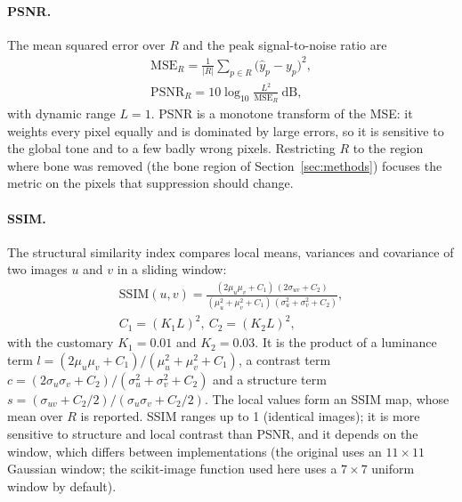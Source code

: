 \paragraph{PSNR.} The mean squared error over $R$ and the peak signal-to-noise ratio are
\begin{equation}
\begin{gathered}
\mathrm{MSE}_R=\frac{1}{|R|}\sum_{p\in R}\big(\hat y_p-y_p\big)^2,\\
\mathrm{PSNR}_R=10\log_{10}\frac{L^2}{\mathrm{MSE}_R}\ \mathrm{dB},
\end{gathered}
\label{eq:bg_psnr}
\end{equation}
with dynamic range $L=1$. PSNR is a monotone transform of the MSE: it weights every pixel equally and is dominated by large errors, so it is
sensitive to the global tone and to a few badly wrong pixels. Restricting $R$ to the region where bone was removed (the bone region of
Section~\ref{sec:methods}) focuses the metric on the pixels that suppression should change.

\paragraph{SSIM.} The structural similarity index \citep{wang2004ssim} compares local means, variances and covariance of two images $u$ and $v$ in
a sliding window:
\begin{equation}
\begin{gathered}
\mathrm{SSIM}(u,v)=\frac{(2\mu_u\mu_v+C_1)\,(2\sigma_{uv}+C_2)}{(\mu_u^2+\mu_v^2+C_1)\,(\sigma_u^2+\sigma_v^2+C_2)},\\
C_1=(K_1L)^2,\ C_2=(K_2L)^2,
\end{gathered}
\label{eq:bg_ssim}
\end{equation}
with the customary $K_1=0.01$ and $K_2=0.03$. It is the product of a luminance term
$l=(2\mu_u\mu_v+C_1)/(\mu_u^2+\mu_v^2+C_1)$, a contrast term $c=(2\sigma_u\sigma_v+C_2)/(\sigma_u^2+\sigma_v^2+C_2)$ and a structure term
$s=(\sigma_{uv}+C_2/2)/(\sigma_u\sigma_v+C_2/2)$. The local values form an SSIM map, whose mean over $R$ is reported. SSIM ranges up to 1
(identical images); it is more sensitive to structure and local contrast than PSNR, and it depends on the window, which differs between
implementations (the original uses an $11\times11$ Gaussian window; the scikit-image function used here uses a $7\times7$ uniform window by
default).

